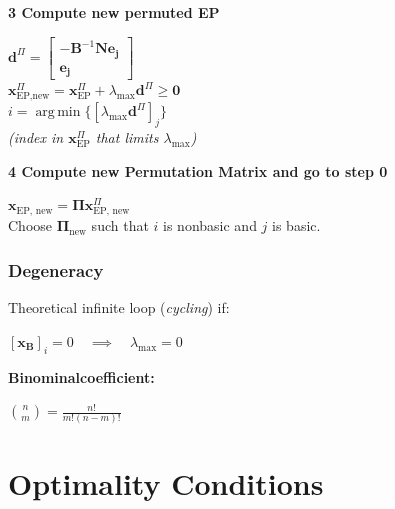 \documentclass[english]{latex4ei/latex4ei_sheet}
\DeclareMathOperator*{\argmin}{arg\,min}
\begin{document}
\begin{sectionbox}
	\textbf{3 Compute new permuted EP}
	\begin{center}
		$\bm{d}^{\Pi} = \begin{bmatrix}
			-\bm{B}^{-1}\bm{N}\bm{e_j} \\
			\bm{e_j}
		\end{bmatrix}$ \\
		\vspace{0.5em}
		$\bm{x}^{\Pi}_{\text{EP,new}} = \bm{x}^{\Pi}_{\text{EP}} + \lambda_{\text{max}}\bm{d}^{\Pi} \bm{\geq} \bm{0}$ \\
		\vspace{0.5em}
		$i = \argmin\{[\lambda_{\text{max}}\bm{d}^{\Pi}]_{j}\}$ \\
		\textit{(index in $\bm{x}^{\Pi}_{\text{EP}}$ that limits $\lambda_{\text{max}}$)}
	\end{center}
	\vspace{1em}
	
	\textbf{4 Compute new Permutation Matrix and go to step 0}
	\begin{center}
		$\bm{x}_{\text{EP, new}} = \bm{\Pi}\bm{x}^{\Pi}_{\text{EP, new}}$ \\
		\vspace{0.5em}
		Choose $\bm{\Pi}_{\text{new}}$ such that $i$ is nonbasic and $j$ is basic.
	\end{center}
	\vspace{4em}
	
	\subsubsection{Degeneracy}
	\vspace{0.3em}
	Theoretical infinite loop (\textit{cycling}) if:
	\begin{center}
		$[\bm{x_B}]_{i} = 0 \quad \implies \quad \lambda_{\text{max}}=0$
	\end{center}
	

\end{sectionbox}

\begin{sectionbox}
	\textbf{Binominalcoefficient: } \\
	\begin{center}
		$\binom{n}{m} = \frac{n!}{m!(n-m)!}$
	\end{center}
\end{sectionbox}

\section{Optimality Conditions}
\end{document}
